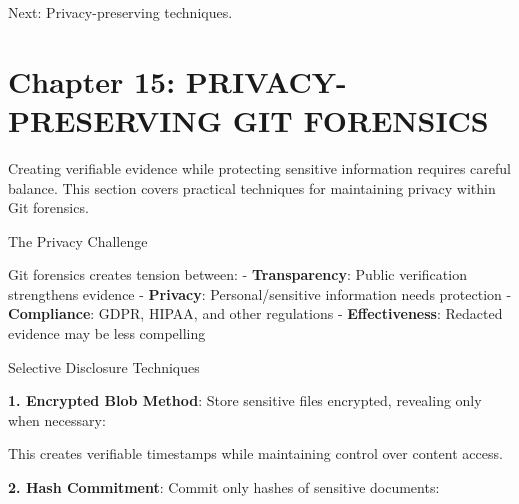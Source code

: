 Next: Privacy-preserving techniques.

\section{Chapter 15: PRIVACY-PRESERVING GIT
FORENSICS}\label{chapter-15-privacy-preserving-git-forensics}

Creating verifiable evidence while protecting sensitive information
requires careful balance. This section covers practical techniques for
maintaining privacy within Git forensics.

The Privacy Challenge

Git forensics creates tension between: - \textbf{Transparency}: Public
verification strengthens evidence - \textbf{Privacy}: Personal/sensitive
information needs protection - \textbf{Compliance}: GDPR, HIPAA, and
other regulations - \textbf{Effectiveness}: Redacted evidence may be
less compelling

Selective Disclosure Techniques

\textbf{1. Encrypted Blob Method}: Store sensitive files encrypted,
revealing only when necessary:

\begin{Shaded}
\begin{Highlighting}[]
  

 

 \OperatorTok{\textgreater{}}
\end{Highlighting}
\end{Shaded}

This creates verifiable timestamps while maintaining control over
content access.

\textbf{2. Hash Commitment}: Commit only hashes of sensitive documents:

\begin{Shaded}
\begin{Highlighting}[]
\OperatorTok{\textgreater{}}

 

\end{Highlighting}
\end{Shaded}

